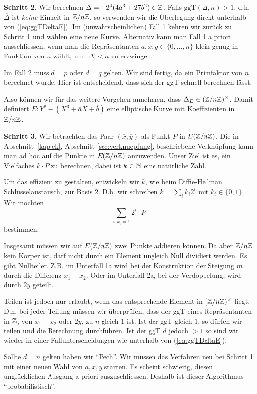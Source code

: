 \bigskip
\textbf{Schritt 2}. Wir berechnen $\Delta = -2^4(4a^3+27b^2)\in{\mathbb{Z}}$.
Falls $\mathrm{ggT}(\Delta,n)>1$, d.h. $\overline\Delta$ ist
\emph{keine} Einheit in ${\mathbb{Z}}/n{\mathbb{Z}}$, so verwenden wir die Überlegung
direkt unterhalb von (\ref{eq:ggTDeltaE}).
Im (unwahrscheinlichen) Fall 1 kehren wir zurück zu Schritt 1 und wählen eine neue Kurve.
Alternativ kann man Fall 1 a priori ausschliessen, wenn man die
Repräsentanten $a,x,y\in \{0,\ldots,n\}$ klein genug in Funktion von
$n$ wählt, um $|\Delta|<n$ zu erzwingen.

Im Fall 2 muss $d=p$ oder $d=q$ gelten. Wir sind fertig, da ein
Primfaktor von $n$ berechnet wurde. Hier ist entscheidend, dass sich
der ggT schnell berechnen lässt.

Also können wir für das weitere Vorgehen annehmen, dass
$\Delta_E\in({\mathbb{Z}}/n{\mathbb{Z}})^\times$. Damit definiert
$E : Y^2 - (X^3+\overline a X + \overline b)$ eine elliptische Kurve
mit Koeffizienten in ${\mathbb{Z}}/n{\mathbb{Z}}$.

\bigskip
\textbf{Schritt 3}. Wir betrachten das Paar $(\overline x,\overline y)$
als Punkt $P$ in $E({\mathbb{Z}}/n{\mathbb{Z}})$. 
Die in Abschnitt~\ref{kap:ek}, Abschnitt \ref{sec:verknuepfung},
beschriebene Verknüpfung kann man
ad hoc auf die  
Punkte in  $E({\mathbb{Z}}/n{\mathbb{Z}})$ anzuwenden.
Unser Ziel ist es, ein Vielfaches $k \cdot P$ zu berechnen, dabei ist
$k\in{\mathbb{N}}$ eine natürliche Zahl.

Um das effizient zu gestalten, entwickeln wir $k$, wie beim
Diffie-Hellman Schlüsselaustausch, zur Basis $2$. D.h. wir schreiben
$k=\sum_{i} k_i 2^i$ mit
$k_{i}\in \{0,1\}$. Wir möchten 
$$
\sum_{i : k_i=1} 2^i \cdot P
$$
bestimmen.

Insgesamt müssen wir auf $E({\mathbb{Z}}/n{\mathbb{Z}})$   zwei Punkte addieren können.
Da aber ${\mathbb{Z}}/n{\mathbb{Z}}$ kein Körper ist, darf nicht durch ein Element
ungleich Null dividiert werden. Es gibt  Nullteiler. 
Z.B. im Unterfall 1a wird bei der Konstruktion der Steigung $m$ durch
die Differenz $x_1-x_2$. Oder im Unterfall 2a, bei der Verdoppelung,
wird durch $2y$ geteilt.

Teilen ist jedoch nur erlaubt, wenn das entsprechende Element in
$({\mathbb{Z}}/n{\mathbb{Z}})^\times$ liegt. D.h. bei jeder Teilung müssen wir
überprüfen, dass der ggT eines Repräsentanten in ${\mathbb{Z}}$, von $x_1-x_2$ oder $2y$,
zu $n$ gleich $1$ ist. Ist der ggT gleich $1$, so dürfen wir teilen
und die Berechnung durchführen.
Ist der ggT $d$ jedoch $>1$ so sind wir wieder in einer
Fallunterscheidungen wie unterhalb von (\ref{eq:ggTDeltaE}).

Sollte $d=n$ gelten haben wir ``Pech''. Wir müssen das Verfahren neu
bei Schritt 1 mit einer neuen Wahl von $\overline a,\overline
x,\overline y$ starten. Es scheint schwierig, diesen unglücklichen
Ausgang a priori auszuschliessen. Deshalb ist dieser Algorithmus
``probabilistisch''.

